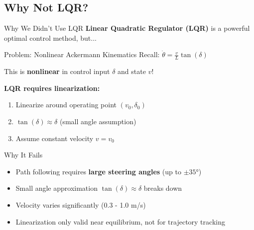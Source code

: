 \documentclass[10pt]{beamer}
\begin{document}
\subsection{Why Not LQR?}

\begin{frame}{Why We Didn't Use LQR}
  \textbf{Linear Quadratic Regulator (LQR)} is a powerful optimal control method, but...

  \vspace{0.3cm}

  \begin{alertblock}{Problem: Nonlinear Ackermann Kinematics}
    Recall: $\dot{\theta} = \frac{v}{L} \tan(\delta)$

    This is \textbf{nonlinear} in control input $\delta$ and state $v$!
  \end{alertblock}

  \textbf{LQR requires linearization:}
  \begin{enumerate}
    \item Linearize around operating point $(v_0, \delta_0)$
    \item $\tan(\delta) \approx \delta$ (small angle assumption)
    \item Assume constant velocity $v = v_0$
  \end{enumerate}

  \vspace{0.3cm}

  \begin{block}{Why It Fails}
    \begin{itemize}
      \item Path following requires \textbf{large steering angles} (up to $\pm 35°$)
      \item Small angle approximation $\tan(\delta) \approx \delta$ breaks down
      \item Velocity varies significantly (0.3 - 1.0 m/s)
      \item Linearization only valid near equilibrium, not for trajectory tracking
    \end{itemize}
  \end{block}
\end{frame}
\end{document}
